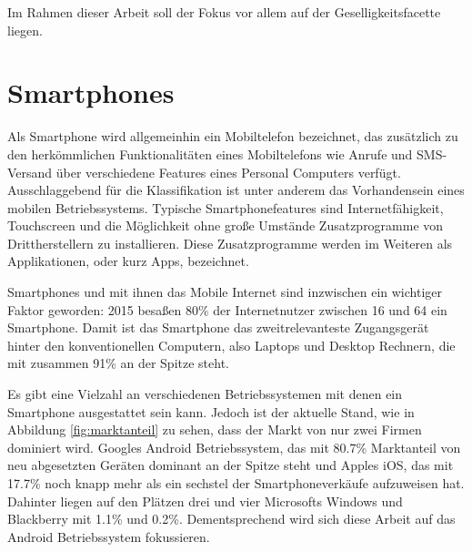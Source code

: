 Im Rahmen dieser Arbeit soll der Fokus vor allem auf der Geselligkeitsfacette liegen.

\section{Smartphones}

\label{ch:Grundlagen:sec:Abschnitt2}


Als Smartphone wird allgemeinhin ein Mobiltelefon bezeichnet, das zusätzlich zu den herkömmlichen Funktionalitäten eines Mobiltelefons wie Anrufe und SMS-Versand über verschiedene Features eines Personal Computers verfügt. 
Ausschlaggebend für die Klassifikation ist unter anderem das Vorhandensein eines mobilen Betriebssystems.
Typische Smartphonefeatures sind Internetfähigkeit, Touchscreen und die Möglichkeit ohne große Umstände Zusatzprogramme von Drittherstellern zu installieren.
Diese Zusatzprogramme werden im Weiteren als Applikationen, oder kurz Apps, bezeichnet.
\par

Smartphones und mit ihnen das Mobile Internet sind inzwischen ein wichtiger Faktor geworden:
2015 besaßen 80\% der Internetnutzer zwischen 16 und 64 ein Smartphone. 
Damit ist das Smartphone das zweitrelevanteste Zugangsgerät hinter den konventionellen Computern, also Laptops und Desktop Rechnern, die mit zusammen 91\% an der Spitze steht\cite{globalwebindex}.
\par

Es gibt eine Vielzahl an verschiedenen Betriebssystemen mit denen ein Smartphone ausgestattet sein kann.
Jedoch ist der aktuelle Stand, wie in Abbildung \ref{fig:marktanteil} zu sehen, dass der Markt von nur zwei Firmen dominiert wird.
Googles Android Betriebssystem, das mit 80.7\% Marktanteil von neu abgesetzten Geräten dominant an der Spitze steht
und Apples iOS, das mit 17.7\% noch knapp mehr als ein sechstel der Smartphoneverkäufe aufzuweisen hat.
Dahinter liegen auf den Plätzen drei und vier Microsofts Windows und Blackberry mit 1.1\% und 0.2\%\cite{smartphonemarktanteil}.
Dementsprechend wird sich diese Arbeit auf das Android Betriebssystem fokussieren.

